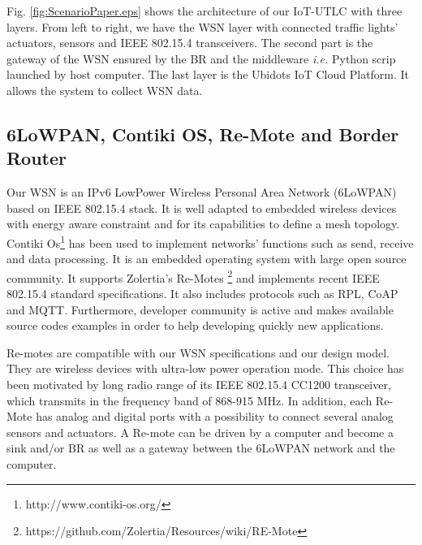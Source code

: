 \documentclass[conference]{../../setup/IEEEtran}
\begin{document}
Fig. \ref{fig:ScenarioPaper.eps} shows the architecture of our IoT-UTLC with three layers. From left to right, we have the WSN layer with connected traffic lights’ actuators, sensors and IEEE 802.15.4 transceivers. The second part is the gateway of the WSN ensured by the BR and the middleware \emph{i.e.} Python scrip launched by host computer. 
The last layer is the Ubidots IoT Cloud Platform. It allows the system to collect WSN data. 



\subsection{6LoWPAN, Contiki OS, Re-Mote and Border Router} \label{Sec:Contiki}

Our WSN is an IPv6 LowPower Wireless Personal Area Network (6LoWPAN) based on IEEE 802.15.4 stack.
It is well adapted to embedded wireless devices with energy aware constraint and for its capabilities to define a mesh topology. Contiki Os\footnote{http://www.contiki-os.org/} has been used to implement networks' functions such as send, receive and data processing. 
It is an embedded operating system with large open source community. It supports Zolertia's Re-Motes \footnote{https://github.com/Zolertia/Resources/wiki/RE-Mote} and implements recent IEEE 802.15.4 standard specifications. It also includes protocols such as RPL, CoAP and MQTT. Furthermore, developer community is active and makes available source codes examples in order to help developing quickly new applications.

Re-motes are compatible with our WSN specifications and our design model. They are wireless devices with ultra-low power operation mode. This choice has been motivated by long radio range of its IEEE 802.15.4 CC1200 transceiver, which transmits in the frequency band of 868-915 MHz. In addition, each Re-Mote has analog and digital ports with a possibility to connect several analog sensors and actuators. A Re-mote can be driven by a computer and become a sink and/or BR as well as a gateway between the 6LoWPAN network and the computer.
\end{document}
